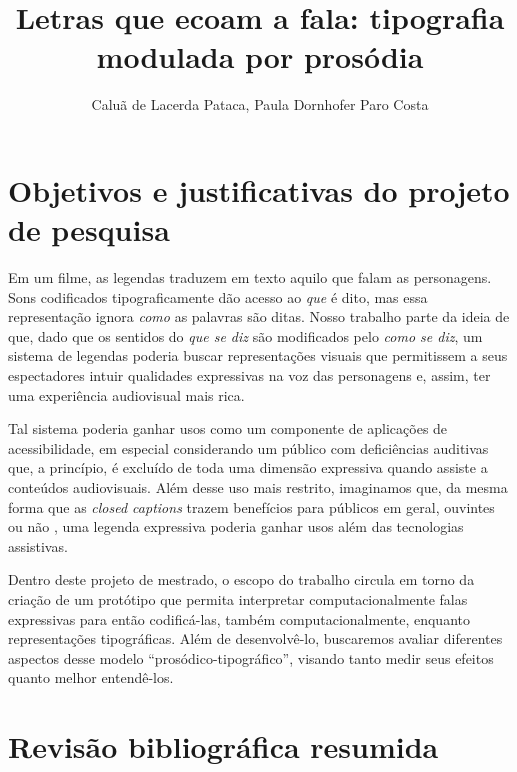 \documentclass[a4paper]{tufte-handout}
\title{Letras que ecoam a fala: tipografia modulada por prosódia}
\author{Caluã de Lacerda Pataca, Paula Dornhofer Paro Costa}
\date{}  %
\begin{document}
\maketitle%



\section{Objetivos e justificativas do projeto de pesquisa}\label{sec:objetivos}

Em um filme, as legendas traduzem em texto aquilo que falam as personagens. Sons codificados tipograficamente dão acesso ao \textit{que} é dito, mas essa representação ignora \textit{como} as palavras são ditas. Nosso trabalho parte da ideia de que, dado que os sentidos do \textit{que se diz} são modificados pelo \textit{como se diz}, um sistema de legendas poderia buscar representações visuais que permitissem a seus espectadores intuir qualidades expressivas na voz das personagens e, assim, ter uma experiência audiovisual mais rica.

Tal sistema poderia ganhar usos como um componente de aplicações de acessibilidade, em especial considerando um público com deficiências auditivas que, a princípio, é excluído de toda uma dimensão expressiva quando assiste a conteúdos audiovisuais. Além desse uso mais restrito, imaginamos que, da mesma forma que as \textit{closed captions} trazem benefícios para públicos em geral, ouvintes ou não \citep{fiske_video_2015}, uma legenda expressiva poderia ganhar usos além das tecnologias assistivas.

Dentro deste projeto de mestrado, o escopo do trabalho circula em torno da criação de um protótipo que permita interpretar computacionalmente falas expressivas para então codificá-las, também computacionalmente, enquanto representações tipográficas. Além de desenvolvê-lo, buscaremos avaliar diferentes aspectos desse modelo ``prosódico-tipográfico'', visando tanto medir seus efeitos quanto melhor entendê-los.

\section{Revisão bibliográfica resumida}\label{sec:revisao_bibliografica}
\end{document}
